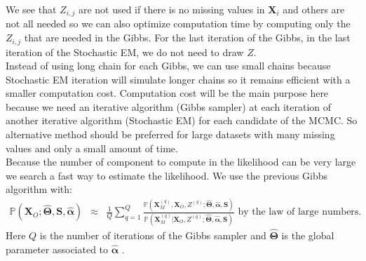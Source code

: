 \documentclass[12pt,a4paper]{report}
\begin{document}
	
	
	We see that $Z_{i,j}$ are not used if there is no missing values in $\boldsymbol{X}_i$ and others are not all needed so we can also optimize computation time by  computing only the $Z_{i,j}$ that are needed in the Gibbs.
	For the last iteration of the Gibbs, in the last iteration of the Stochastic EM, we do not need to draw $Z$.	\\
	
	Instead of using long chain for each Gibbs, we can use small chains because Stochastic EM iteration will simulate longer chains so it remains efficient with a smaller computation cost.
	Computation cost will be the main purpose here because we need an iterative algorithm (Gibbs sampler) at each iteration of another iterative algorithm (Stochastic EM) for each candidate of the MCMC.
	So alternative method should be preferred for large datasets with many missing values and only a small amount of time.\\
	

%	
	Because the number of component to compute in the likelihood can be very large we search a fast way to estimate the likelihood.
%	
	 We use the previous Gibbs algorithm with:
	\begin{eqnarray}
	\mathbb{P}(\boldsymbol{X}_O;\hat{\boldsymbol{\Theta}}, \boldsymbol{S}, \hat{\boldsymbol{\alpha}})&\approx & \frac{1}{Q} \sum_{q=1}^Q
	\frac{\mathbb{P}(\boldsymbol{X}_M^{(q)},\boldsymbol{X}_O,Z^{(q)};\hat{\boldsymbol{\Theta}},\hat{\boldsymbol{\alpha}},\boldsymbol{S})}
	{\mathbb{P}(\boldsymbol{X}_M^{(q)}|\boldsymbol{X}_O,Z^{(q)};\hat{\boldsymbol{\Theta}},\hat{\boldsymbol{\alpha}},\boldsymbol{S})} \textrm{ by the law of large numbers. } \ \ \ \nonumber
	\end{eqnarray}	
	Here $Q$ is the number of iterations of the Gibbs sampler and $\hat{\boldsymbol{\Theta}}$ is the global parameter associated to $\hat{\boldsymbol{\alpha}}$ .
\end{document}
